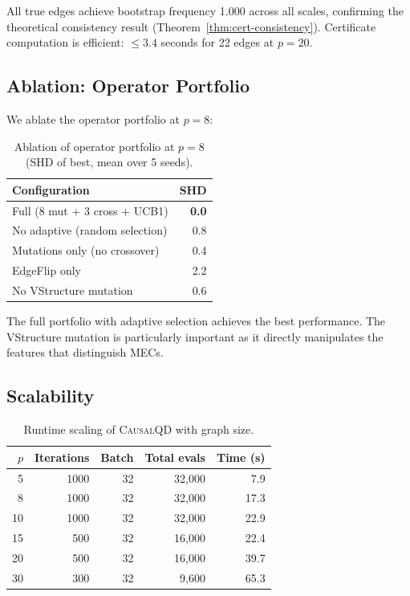 \documentclass[11pt,a4paper]{article}
\begin{document}
All true edges achieve bootstrap frequency 1.000 across all scales, confirming the theoretical consistency result (Theorem~\ref{thm:cert-consistency}). Certificate computation is efficient: $\leq 3.4$ seconds for 22 edges at $p = 20$.

\subsection{Ablation: Operator Portfolio}

We ablate the operator portfolio at $p = 8$:

\begin{table}[t]
\centering
\caption{Ablation of operator portfolio at $p = 8$ (SHD of best, mean over 5 seeds).}
\label{tab:ablation}
\begin{tabular}{@{}lr@{}}
\toprule
\textbf{Configuration} & \textbf{SHD} \\
\midrule
Full (8 mut + 3 cross + UCB1) & \textbf{0.0} \\
No adaptive (random selection) & 0.8 \\
Mutations only (no crossover) & 0.4 \\
EdgeFlip only & 2.2 \\
No VStructure mutation & 0.6 \\
\bottomrule
\end{tabular}
\end{table}

The full portfolio with adaptive selection achieves the best performance. The VStructure mutation is particularly important as it directly manipulates the features that distinguish MECs.

\subsection{Scalability}

\begin{table}[t]
\centering
\caption{Runtime scaling of \textsc{CausalQD} with graph size.}
\label{tab:scalability}
\begin{tabular}{@{}rrrrr@{}}
\toprule
$p$ & Iterations & Batch & Total evals & Time (s) \\
\midrule
5 & 1000 & 32 & 32,000 & 7.9 \\
8 & 1000 & 32 & 32,000 & 17.3 \\
10 & 1000 & 32 & 32,000 & 22.9 \\
15 & 500 & 32 & 16,000 & 22.4 \\
20 & 500 & 32 & 16,000 & 39.7 \\
30 & 300 & 32 & 9,600 & 65.3 \\
\bottomrule
\end{tabular}
\end{table}
\end{document}
